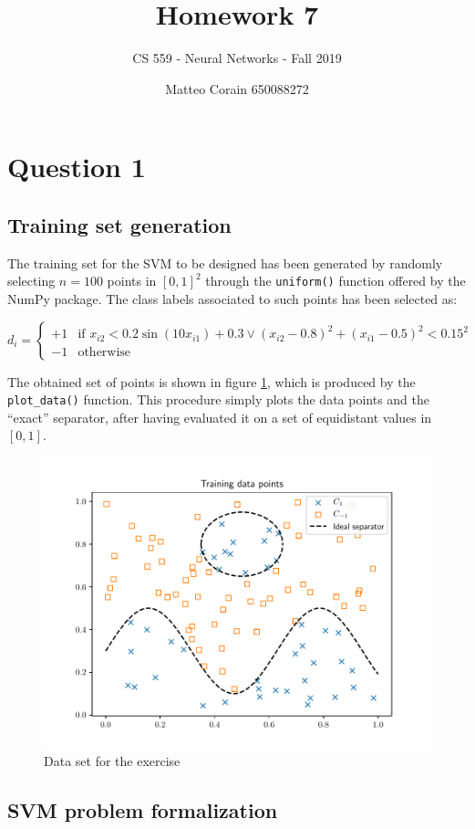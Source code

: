 \documentclass[letterpaper,headings=standardclasses]{scrartcl}
\title{Homework 7}
\subtitle{CS 559 - Neural Networks - Fall 2019}
\author{Matteo Corain 650088272}
\begin{document}
\maketitle

\section{Question 1}

\subsection{Training set generation}

The training set for the SVM to be designed has been generated by randomly selecting $n = 100$ points in $[0,1]^2$ through the \texttt{uniform()} function offered by the NumPy package. The class labels associated to such points has been selected as:

$$ d_i = \begin{cases} +1 & \text{if } x_{i2} < 0.2 \sin{(10x_{i1})} + 0.3 \vee (x_{i2} - 0.8)^2 + (x_{i1} - 0.5)^2 < 0.15^2 \\ -1 & \text{otherwise} \end{cases} $$

The obtained set of points is shown in figure \ref{data}, which is produced by the \texttt{plot\_data()} function. This procedure simply plots the data points and the ``exact'' separator, after having evaluated it on a set of equidistant values in $[0,1]$.

\begin{figure}[h]
    \centering
    \includegraphics[width=0.7\linewidth]{data.pdf}
    \caption{Data set for the exercise}
    \label{data}
\end{figure}

\subsection{SVM problem formalization}
\end{document}
